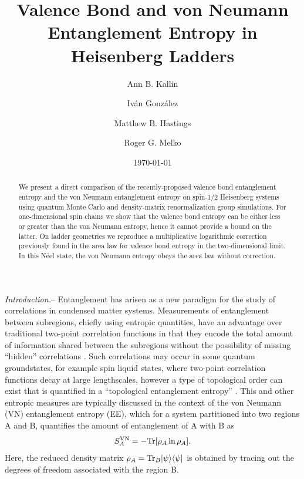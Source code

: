 \documentclass[prl,aps,twocolumn,floatfix,amsmath,amssymb,superscriptaddress,tightenlines]{revtex4}
\begin{document}
\date{\today}
\title{Valence Bond and von Neumann Entanglement Entropy in Heisenberg Ladders}
\author{Ann B. Kallin}

\author{Iv\'an Gonz\'alez}

\author{Matthew B. Hastings}

\author{Roger G. Melko}

\begin{abstract} We present a direct comparison of the recently-proposed
valence bond entanglement entropy and the von Neumann entanglement entropy on
spin-1/2 Heisenberg systems using quantum Monte Carlo and density-matrix
renormalization group simulations.  For one-dimensional spin chains we
show that the valence bond entropy can be either less or greater than the
von Neumann entropy, hence it cannot provide a bound on the latter.  On
ladder geometries we reproduce a multiplicative logarithmic correction
previously found in the area law for valence bond entropy in the
two-dimensional limit.  In this N\'eel state, the von Neumann entropy
obeys the area law without correction.

\end{abstract}
\maketitle


{\it Introduction.}-- Entanglement has arisen 
as a new paradigm for the study of correlations in condensed matter systems.  
Measurements
of entanglement between subregions, chiefly using entropic
quantities, have an advantage over traditional two-point correlation
functions in that they encode the total amount of information shared
between the subregions without the possibility of missing ``hidden''
correlations \cite{wolf}.  
Such correlations may occur in some quantum groundstates,  for example spin liquid states, 
where two-point correlation functions decay at large lengthscales, however a type of topological order can exist that is quantified in a ``topological entanglement
entropy''  \cite{ KP, LW}.
This and other entropic measures are typically discussed in the context of
the von Neumann (VN) entanglement entropy (EE), which for a system partitioned into
two regions A and B, quantifies the amount of entanglement of A with B as
\begin{equation} 
S^{\rm VN}_A = - {\rm Tr} [ \rho_A \ln \rho_A ]. \label{vNEE} 
\end{equation}
Here, the reduced density matrix $\rho_A = {\rm Tr}_B | \psi \rangle
\langle \psi |$ is obtained by tracing out the degrees of freedom
associated with the region B.
\end{document}
